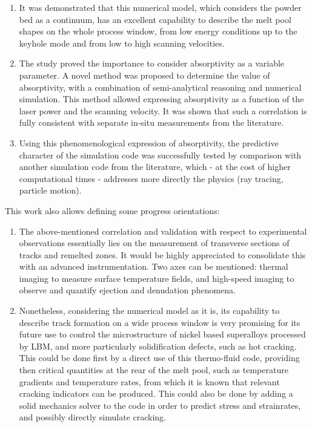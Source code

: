 \documentclass[10pt]{article}
\begin{document}
\begin{enumerate}
  \item It was demonstrated that this numerical model, which considers the powder bed as a continuum, has an excellent capability to describe the melt pool shapes on the whole process window, from low energy conditions up to the keyhole mode and from low to high scanning velocities.

  \item The study proved the importance to consider absorptivity as a variable parameter. A novel method was proposed to determine the value of absorptivity, with a combination of semi-analytical reasoning and numerical simulation. This method allowed expressing absorptivity as a function of the laser power and the scanning velocity. It was shown that such a correlation is fully consistent with separate in-situ measurements from the literature.

  \item Using this phenomenological expression of absorptivity, the predictive character of the simulation code was successfully tested by comparison with another simulation code from the literature, which - at the cost of higher computational times - addresses more directly the physics (ray tracing, particle motion).

\end{enumerate}

This work also allows defining some progress orientations:

\begin{enumerate}
  \item The above-mentioned correlation and validation with respect to experimental observations essentially lies on the measurement of transverse sections of tracks and remelted zones. It would be highly appreciated to consolidate this with an advanced instrumentation. Two axes can be mentioned: thermal imaging to measure surface temperature fields, and high-speed imaging to observe and quantify ejection and denudation phenomena.

  \item Nonetheless, considering the numerical model as it is, its capability to describe track formation on a wide process window is very promising for its future use to control the microstructure of nickel based superalloys processed by LBM, and more particularly solidification defects, such as hot cracking. This could be done first by a direct use of this thermo-fluid code, providing then critical quantities at the rear of the melt pool, such as temperature gradients and temperature rates, from which it is known that relevant cracking indicators can be produced. This could also be done by adding a solid mechanics solver to the code in order to predict stress and strainrates, and possibly directly simulate cracking.

\end{enumerate}
\end{document}
